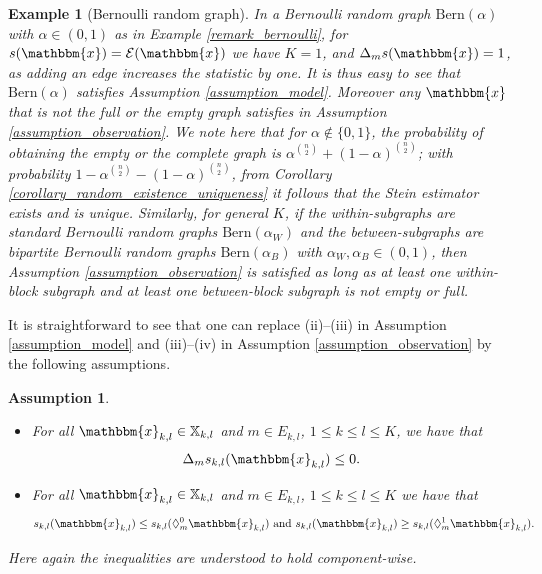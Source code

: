 \documentclass{article}
\newtheorem{Assumption}[Theorem]{Assumption}
\newtheorem{Example}[Theorem]{Example}
\begin{document}
\begin{Example}[Bernoulli random graph]
    In a Bernoulli random graph $\mathrm{Bern}(\alpha)$ with $\alpha \in (0,1)$ as in Example \ref{remark_bernoulli}, for $s(\mathbbm{x})=\mathcal{E}(\mathbbm{x})$  we have $K=1$, and $\Delta_m s(\mathbbm{x}) =1$, as adding an edge increases the statistic by one. It is thus easy to see that   $\mathrm{Bern}(\alpha)$ satisfies Assumption \ref{assumption_model}. Moreover any $\mathbbm{x}$ that is not the full or the empty graph satisfies in Assumption \ref{assumption_observation}. We note here that for $\alpha \notin \{0,1\}$, the probability of obtaining the empty or the complete graph is $\alpha^{\binom{n}{2}} + (1-\alpha)^{\binom{n}{2}}$; with probability $1 - \alpha^{\binom{n}{2}} - (1-\alpha)^{\binom{n}{2}} $, from Corollary \ref{corollary_random_existence_uniqueness} it follows that the Stein estimator exists and is unique. Similarly, for general $K$, if the within-subgraphs are standard Bernoulli random graphs $\mathrm{Bern}(\alpha_W)$ and the between-subgraphs are bipartite Bernoulli random graphs $\mathrm{Bern}(\alpha_B)$ with $\alpha_W, \alpha_B \in (0,1)$, then Assumption \ref{assumption_observation} is satisfied as long as at least one within-block subgraph and at least one between-block subgraph is not empty or full.
\end{Example}

It is straightforward to see that one can replace (ii)--(iii) in Assumption \ref{assumption_model} and (iii)--(iv) in Assumption \ref{assumption_observation} by the following assumptions. 
\begin{Assumption}
\label{assumption_model_alt}
    \begin{itemize}
        \item[(ii)']  For all $\mathbbm{x}_{k,l} \in \mathbb{X}_{k,l}$ and $m \in E_{k,l}$, $1 \leq k \leq l\leq K$, we have that 
        \begin{align*}
            \Delta_m s_{k,l}(\mathbbm{x}_{k,l}) \leq 0 .   
        \end{align*}
        \item[(iii)']  For all $\mathbbm{x}_{k,l} \in \mathbb{X}_{k,l}$ and $m \in E_{k,l}$, $1 \leq k \leq l\leq K$ we have that 
        \begin{align*}  
            s_{k,l}(\mathbbm{x}_{k,l}) \leq s_{k,l}(\Diamond_{m}^{0}\mathbbm{x}_{k,l})  \text{ and  } s_{k,l}(\mathbbm{x}_{k,l}) \geq s_{k,l}(\Diamond_{m}^{1}\mathbbm{x}_{k,l}).
        \end{align*}
    \end{itemize}
    Here again  the inequalities are understood to hold component-wise.
\end{Assumption} 
\end{document}
